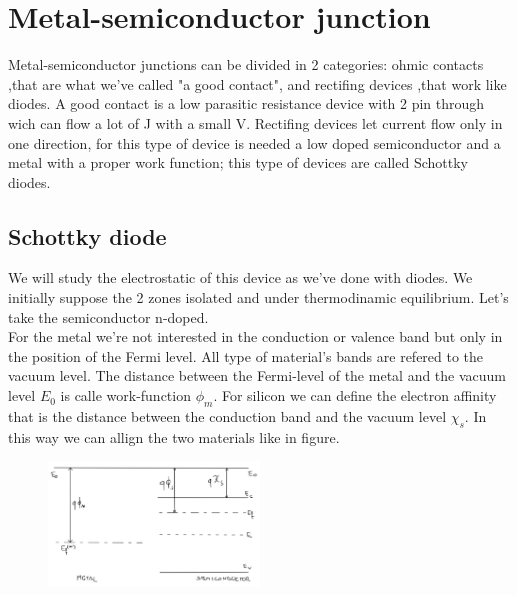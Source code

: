\chapter{Metal-semiconductor junction}
Metal-semiconductor junctions can be divided in 2 categories: ohmic contacts ,that are what we've called "a good contact", and rectifing devices ,that work like diodes. A good contact is a low parasitic resistance device with 2 pin through wich can flow a lot of J with a small V. Rectifing devices let current flow only in one direction, for this type of device is needed a low doped semiconductor and a metal with a proper work function; this type of devices are called Schottky diodes.

\section{Schottky diode}
We will study the electrostatic of this device as we've done with diodes. We initially suppose the 2 zones isolated and under thermodinamic equilibrium. Let's take the semiconductor n-doped.\\
For the metal we're not interested in the conduction or valence band but only in the position of the Fermi level. All type of material's bands are refered to the vacuum level. The distance between the Fermi-level of the metal and the vacuum level $E_0$ is calle work-function $\phi_m$. For silicon we can define the electron affinity that is the distance between the conduction band and the vacuum level $\chi_s$. In this way we can allign the two materials like in figure.\\

\begin{figure}
\includegraphics[width=0.5\textwidth]{ms1.png}
\end{figure}

